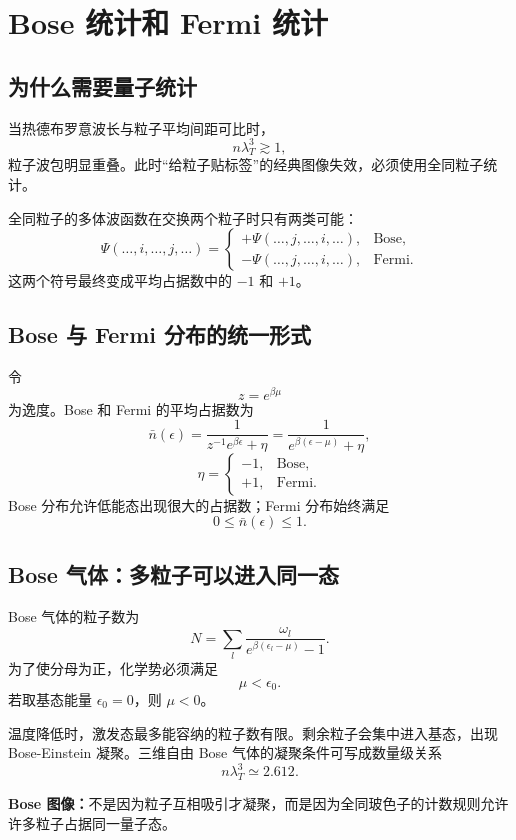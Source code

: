 \chapter{Bose 统计和 Fermi 统计}

\section{为什么需要量子统计}

当热德布罗意波长与粒子平均间距可比时，
\[
  n\lambda_T^3 \gtrsim 1,
\]
粒子波包明显重叠。此时“给粒子贴标签”的经典图像失效，必须使用全同粒子统计。

全同粒子的多体波函数在交换两个粒子时只有两类可能：
\[
  \Psi(\ldots,i,\ldots,j,\ldots)
  =
  \begin{cases}
    +\Psi(\ldots,j,\ldots,i,\ldots), & \text{Bose},\\
    -\Psi(\ldots,j,\ldots,i,\ldots), & \text{Fermi}.
  \end{cases}
\]
这两个符号最终变成平均占据数中的 $-1$ 和 $+1$。

\section{Bose 与 Fermi 分布的统一形式}

令
\[
  z=e^{\beta\mu}
\]
为逸度。Bose 和 Fermi 的平均占据数为
\[
  \bar n(\epsilon)
  =
  \frac{1}{z^{-1}e^{\beta\epsilon}+\eta}
  =
  \frac{1}{e^{\beta(\epsilon-\mu)}+\eta},
\]
\[
  \eta=
  \begin{cases}
    -1, & \text{Bose},\\
    +1, & \text{Fermi}.
  \end{cases}
\]
Bose 分布允许低能态出现很大的占据数；Fermi 分布始终满足
\[
  0\le \bar n(\epsilon)\le 1.
\]

\section{Bose 气体：多粒子可以进入同一态}

Bose 气体的粒子数为
\[
  N=\sum_l
  \frac{\omega_l}{e^{\beta(\epsilon_l-\mu)}-1}.
\]
为了使分母为正，化学势必须满足
\[
  \mu<\epsilon_0.
\]
若取基态能量 $\epsilon_0=0$，则 $\mu<0$。

温度降低时，激发态最多能容纳的粒子数有限。剩余粒子会集中进入基态，出现 Bose-Einstein 凝聚。三维自由 Bose 气体的凝聚条件可写成数量级关系
\[
  n\lambda_T^3\simeq 2.612.
\]

\begin{keybox}
\textbf{Bose 图像：}不是因为粒子互相吸引才凝聚，而是因为全同玻色子的计数规则允许许多粒子占据同一量子态。
\end{keybox}

